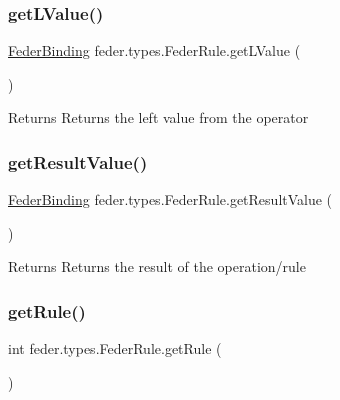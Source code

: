 \subsubsection{\texorpdfstring{get\+L\+Value()}{getLValue()}}
{\footnotesize\ttfamily \hyperlink{classfeder_1_1types_1_1FederBinding}{Feder\+Binding} feder.\+types.\+Feder\+Rule.\+get\+L\+Value (\begin{DoxyParamCaption}{ }\end{DoxyParamCaption})}

\begin{DoxyReturn}{Returns}
Returns the left value from the operator 
\end{DoxyReturn}
\mbox{\label{classfeder_1_1types_1_1FederRule_a48e0b9aca68eff113f51c03a3198ff70}} 
\subsubsection{\texorpdfstring{get\+Result\+Value()}{getResultValue()}}
{\footnotesize\ttfamily \hyperlink{classfeder_1_1types_1_1FederBinding}{Feder\+Binding} feder.\+types.\+Feder\+Rule.\+get\+Result\+Value (\begin{DoxyParamCaption}{ }\end{DoxyParamCaption})}

\begin{DoxyReturn}{Returns}
Returns the result of the operation/rule 
\end{DoxyReturn}
\mbox{\label{classfeder_1_1types_1_1FederRule_a2463391941d5dc6afefa1e672fc1c62d}} 
\subsubsection{\texorpdfstring{get\+Rule()}{getRule()}}
{\footnotesize\ttfamily int feder.\+types.\+Feder\+Rule.\+get\+Rule (\begin{DoxyParamCaption}{ }\end{DoxyParamCaption})}

